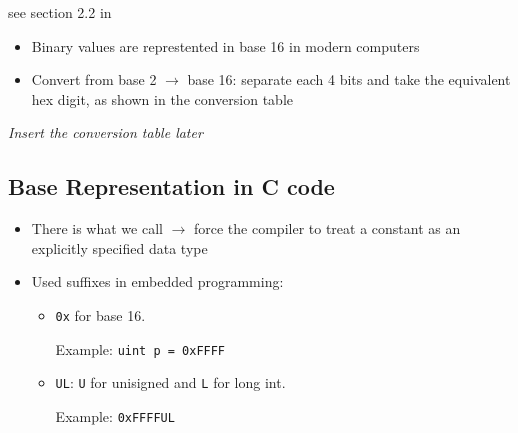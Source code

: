 see section 2.2 in \cite{book_Embedded_systems_ARM_Cortex_M_YifengZhu}

\begin{itemize}

\item Binary values are represtented in base 16 in modern computers

\item Convert from base 2 $\rightarrow$ base 16: separate each 4 bits and take the equivalent hex digit, as shown in the conversion table

\end{itemize}

 \textit{Insert the conversion table later}

\subsection{Base Representation in C code}

\begin{itemize}

\item There is what we call  $\rightarrow$ force the compiler to treat a constant as an explicitly specified data type

\item Used suffixes in embedded programming:

	\begin{itemize}
	\item \verb|0x| for base 16. 
	
	Example: \verb|uint p = 0xFFFF|
	
	
	\item \verb|UL|:  \verb|U| for unisigned and \verb|L| for long int.
	
	Example: \verb|0xFFFFUL|
	
	\end{itemize}


\end{itemize}


